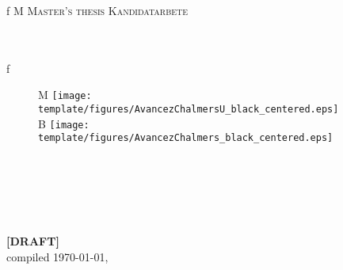 \begingroup %
\newpage
\thispagestyle{empty}
\begin{center}
    \if\thesisStatus f
        \textsc{\large
        \if\thesisType M
            Master's thesis
        \else
            Kandidatarbete
        \fi
        \thesisYear
        }
    \else
        \mbox{}
    \fi
    \\[4cm]
    \textbf{\Large \thesisTitle} \\[1cm]
    {\large \thesisSubtitle}\\[1cm]
    {\large \thesisAuthor}

    \if\thesisStatus f
        \vfill
        \begin{figure}[H]
        \centering
        \if\thesisType M
        \texttt{[image: template/figures/AvancezChalmersU\_black\_centered.eps]} \\
        \fi
        \if\thesisType B
        \texttt{[image: template/figures/AvancezChalmers\_black\_centered.eps]} \\
        \fi
        \end{figure}
        \vspace{5mm}

        \thesisDepartment\\
        \emph{\thesisDivision}\\
        \ifx\thesisGroup\undefined
        \else
            \thesisGroup\\
        \fi
        \textsc{\thesisUniversity}\\
        \thesisLocation\ \thesisYear\\
    \else
        \vspace{5cm}
		\textbf{\Huge [DRAFT]}\\[1cm]
		compiled \today, \currenttime
    \fi
\end{center}
\endgroup
